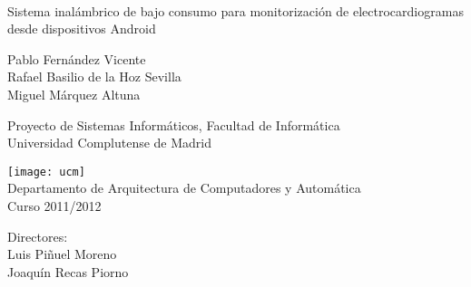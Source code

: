 \thispagestyle{empty}

\begin{center}
	{\LARGE \textbf{\thetitle}}\\
	\vspace{0.5cm}
	{\Large Sistema inalámbrico de bajo consumo para monitorización de electrocardiogramas desde dispositivos Android}

	\vspace{1cm}
	{\large
		Pablo Fernández Vicente\\
		Rafael Basilio de la Hoz Sevilla\\
		\vspace{1.5mm}
		\hspace{1mm}Miguel Márquez Altuna
	}

	\vspace{1cm}
	Proyecto de Sistemas Informáticos, 
	Facultad de Informática\\
	Universidad Complutense de Madrid
	\vspace{1cm}

	\texttt{[image: ucm]}\\
	\vspace{.5cm}
	Departamento de Arquitectura de Computadores y Automática\\
	Curso 2011/2012
\end{center}

\begin{flushright}
	Directores:\\
	Luis Piñuel Moreno\\
	Joaquín Recas Piorno\\
\end{flushright}

